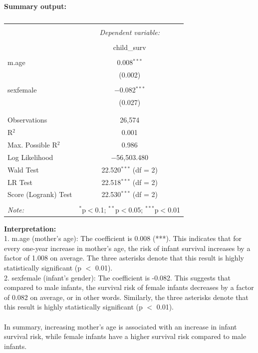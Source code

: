 \documentclass[12pt,letterpaper]{article}
\begin{document}
    \noindent \textbf{Summary output:}
    \begin{table}[!htbp] \centering   \caption{}   \label{} 
    	\begin{tabular}{@{\extracolsep{5pt}}lc} \\[-1.8ex]\hline \hline \\[-1.8ex]  & \multicolumn{1}{c}{\textit{Dependent variable:}} \\ \cline{2-2} \\[-1.8ex] & child\_surv \\ \hline \\[-1.8ex]  m.age & 0.008$^{***}$ \\   & (0.002) \\   & \\  sexfemale & $-$0.082$^{***}$ \\   & (0.027) \\   & \\ \hline \\[-1.8ex] Observations & 26,574 \\ R$^{2}$ & 0.001 \\ Max. Possible R$^{2}$ & 0.986 \\ Log Likelihood & $-$56,503.480 \\ Wald Test & 22.520$^{***}$ (df = 2) \\ LR Test & 22.518$^{***}$ (df = 2) \\ Score (Logrank) Test & 22.530$^{***}$ (df = 2) \\ \hline \hline \\[-1.8ex] \textit{Note:}  & \multicolumn{1}{r}{$^{*}$p$<$0.1; $^{**}$p$<$0.05; $^{***}$p$<$0.01} \\ 
    	\end{tabular} 
    \end{table} 

	
	\noindent \textbf{Interpretation:} 
	\\1. m.age (mother's age): The coefficient is 0.008 (***). This indicates that for every one-year increase in mother's age, the risk of infant survival increases by a factor of 1.008 on average. The three asterisks denote that this result is highly statistically significant (p $<$ 0.01).
	\\2. sexfemale (infant's gender): The coefficient is -0.082. This suggests that compared to male infants, the survival risk of female infants decreases by a factor of 0.082 on average, or in other words. Similarly, the three asterisks denote that this result is highly statistically significant (p $<$ 0.01).
	\\\\In summary, increasing mother's age is associated with an increase in infant survival risk, while female infants have a higher survival risk compared to male infants.
	
\end{document}
